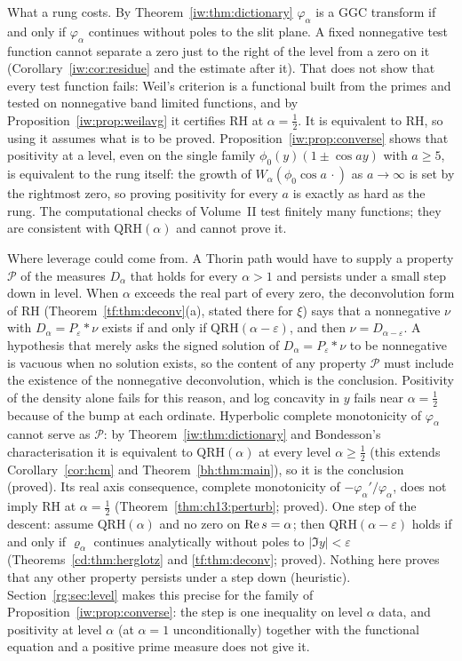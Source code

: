 What a rung costs. By Theorem~\ref{iw:thm:dictionary} $\varphi_\alpha$ is a GGC transform if and only if $\varphi_\alpha$ continues without poles to the slit plane. A fixed nonnegative test function cannot separate a zero just to the right of the level from a zero on it (Corollary~\ref{iw:cor:residue} and the estimate after it). That does not show that every test function fails: Weil's criterion is a functional built from the primes and tested on nonnegative band limited functions, and by Proposition~\ref{iw:prop:weilavg} it certifies RH at $\alpha=\frac12$. It is equivalent to RH, so using it assumes what is to be proved. Proposition~\ref{iw:prop:converse} shows that positivity at a level, even on the single family $\phi_0(y)(1\pm\cos ay)$ with $a\ge5$, is equivalent to the rung itself: the growth of $W_\alpha(\phi_0\cos a\,\cdot)$ as $a\to\infty$ is set by the rightmost zero, so proving positivity for every $a$ is exactly as hard as the rung. The computational checks of Volume~II test finitely many functions; they are consistent with $\mathrm{QRH}(\alpha)$ and cannot prove it.

Where leverage could come from. A Thorin path would have to supply a property $\mathcal P$ of the measures $D_\alpha$ that holds for every $\alpha>1$ and persists under a small step down in level. When $\alpha$ exceeds the real part of every zero, the deconvolution form of RH (Theorem~\ref{tf:thm:deconv}(a), stated there for $\xi$) says that a nonnegative $\nu$ with $D_\alpha=P_\varepsilon*\nu$ exists if and only if $\mathrm{QRH}(\alpha-\varepsilon)$, and then $\nu=D_{\alpha-\varepsilon}$. A hypothesis that merely asks the signed solution of $D_\alpha=P_\varepsilon*\nu$ to be nonnegative is vacuous when no solution exists, so the content of any property $\mathcal P$ must include the existence of the nonnegative deconvolution, which is the conclusion. Positivity of the density alone fails for this reason, and log concavity in $y$ fails near $\alpha=\frac12$ because of the bump at each ordinate. Hyperbolic complete monotonicity of $\varphi_\alpha$ cannot serve as $\mathcal P$: by Theorem~\ref{iw:thm:dictionary} and Bondesson's characterisation \cite[Theorem 6.1.1]{Bondesson} it is equivalent to $\mathrm{QRH}(\alpha)$ at every level $\alpha\ge\frac12$ (this extends Corollary~\ref{cor:hcm} and Theorem~\ref{bh:thm:main}), so it is the conclusion (proved). Its real axis consequence, complete monotonicity of $-\varphi_\alpha'/\varphi_\alpha$, does not imply RH at $\alpha=\frac12$ (Theorem~\ref{thm:ch13:perturb}; proved). One step of the descent: assume $\mathrm{QRH}(\alpha)$ and no zero on $\operatorname{Re} s=\alpha$; then $\mathrm{QRH}(\alpha-\varepsilon)$ holds if and only if $\varrho_\alpha$ continues analytically without poles to $|\Im y|<\varepsilon$ (Theorems~\ref{cd:thm:herglotz} and \ref{tf:thm:deconv}; proved). Nothing here proves that any other property persists under a step down (heuristic). Section~\ref{rg:sec:level} makes this precise for the family of Proposition~\ref{iw:prop:converse}: the step is one inequality on level $\alpha$ data, and positivity at level $\alpha$ (at $\alpha=1$ unconditionally) together with the functional equation and a positive prime measure does not give it.

